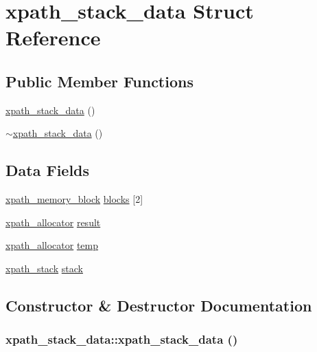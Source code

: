 \hypertarget{structxpath__stack__data}{
\section{xpath\_\-stack\_\-data Struct Reference}
\label{structxpath__stack__data}
}
\subsection*{Public Member Functions}
\begin{CompactItemize}
\item 
\hyperlink{structxpath__stack__data_ba4a588075a5ec45a3aa661b97d62ca6}{xpath\_\-stack\_\-data} ()
\item 
\hyperlink{structxpath__stack__data_1df4e020ecc629b398336969c8490d98}{$\sim$xpath\_\-stack\_\-data} ()
\end{CompactItemize}
\subsection*{Data Fields}
\begin{CompactItemize}
\item 
\hyperlink{structxpath__memory__block}{xpath\_\-memory\_\-block} \hyperlink{structxpath__stack__data_6821cc444dd65d997467fd3f757f4aff}{blocks} \mbox{[}2\mbox{]}
\item 
\hyperlink{classxpath__allocator}{xpath\_\-allocator} \hyperlink{structxpath__stack__data_b073a685c66383ded44076993afe62d6}{result}
\item 
\hyperlink{classxpath__allocator}{xpath\_\-allocator} \hyperlink{structxpath__stack__data_56e6bb486d52f4c5c2d02370e1b41058}{temp}
\item 
\hyperlink{structxpath__stack}{xpath\_\-stack} \hyperlink{structxpath__stack__data_d26a92328f9aaf83fa62cb6695dbee90}{stack}
\end{CompactItemize}


\subsection{Constructor \& Destructor Documentation}
\hypertarget{structxpath__stack__data_ba4a588075a5ec45a3aa661b97d62ca6}{
\subsubsection[xpath\_\-stack\_\-data]{\setlength{\rightskip}{0pt plus 5cm}xpath\_\-stack\_\-data::xpath\_\-stack\_\-data ()}}
\label{structxpath__stack__data_ba4a588075a5ec45a3aa661b97d62ca6}


